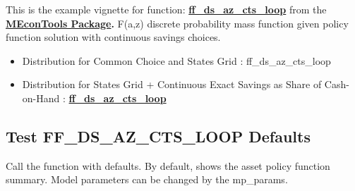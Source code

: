 \documentclass[
]{book}
\begin{document}
This is the example vignette for function:
\href{https://github.com/FanWangEcon/MEconTools/blob/master/MEconTools/vfi/ff_ds_az_cts_loop.m}{\textbf{ff\_ds\_az\_cts\_loop}}
from the \href{https://fanwangecon.github.io/MEconTools/}{\textbf{MEconTools
Package}}\textbf{.} F(a,z)
discrete probability mass function given policy function solution with
continuous savings choices.

\begin{itemize}
\item
  Distribution for Common Choice and States Grid :
  ff\_ds\_az\_cts\_loop
\item
  Distribution for States Grid + Continuous Exact Savings as Share of
  Cash-on-Hand :
  \href{https://github.com/FanWangEcon/MEconTools/blob/master/MEconTools/vfi/ff_ds_az_cts_loop.m}{\textbf{ff\_ds\_az\_cts\_loop}}
\end{itemize}

\hypertarget{test-ff_ds_az_cts_loop-defaults}{%
\subsection{Test FF\_DS\_AZ\_CTS\_LOOP Defaults}\label{test-ff_ds_az_cts_loop-defaults}}

Call the function with defaults. By default, shows the asset policy
function summary. Model parameters can be changed by the mp\_params.
\end{document}

